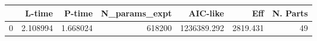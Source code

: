 \begin{tabular}{lrrrrrr}
\toprule
{} &    L-time &    P-time &  N\_params\_expt &     AIC-like &       Eff &  N. Parts \\
\midrule
0 &  2.108994 &  1.668024 &         618200 &  1236389.292 &  2819.431 &        49 \\
\bottomrule
\end{tabular}
